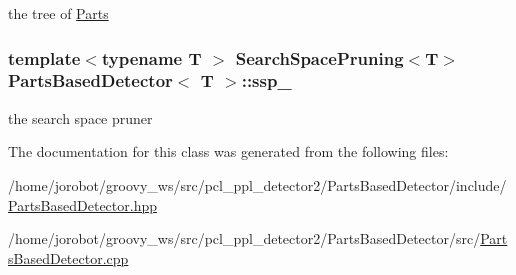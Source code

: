 the tree of \hyperlink{classParts}{\-Parts} 

\hypertarget{classPartsBasedDetector_aae91c693f9d01e3e6cbd552d7f81e474}{
\subsubsection[{ssp\-\_\-}]{\setlength{\rightskip}{0pt plus 5cm}template$<$typename T $>$ {\bf \-Search\-Space\-Pruning}$<$\-T$>$ {\bf \-Parts\-Based\-Detector}$<$ \-T $>$\-::{\bf ssp\-\_\-}}}\label{classPartsBasedDetector_aae91c693f9d01e3e6cbd552d7f81e474}


the search space pruner 



\-The documentation for this class was generated from the following files\-:\begin{DoxyCompactItemize}
\item 
/home/jorobot/groovy\-\_\-ws/src/pcl\-\_\-ppl\-\_\-detector2/\-Parts\-Based\-Detector/include/\hyperlink{PartsBasedDetector_8hpp}{\-Parts\-Based\-Detector.\-hpp}\item 
/home/jorobot/groovy\-\_\-ws/src/pcl\-\_\-ppl\-\_\-detector2/\-Parts\-Based\-Detector/src/\hyperlink{PartsBasedDetector_8cpp}{\-Parts\-Based\-Detector.\-cpp}\end{DoxyCompactItemize}
